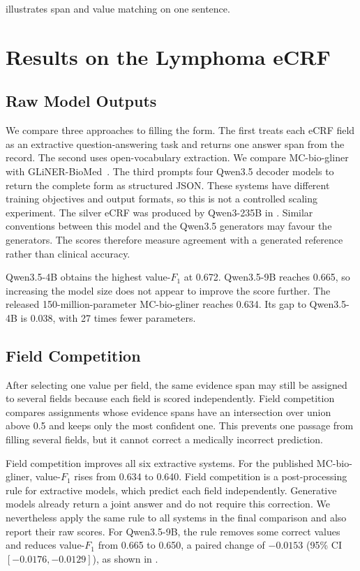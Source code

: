  illustrates span and value matching on one sentence.



\section{Results on the Lymphoma eCRF}

\subsection{Raw Model Outputs}

We compare three approaches to filling the form. The first treats each eCRF
field as an extractive question-answering task and returns one answer span from
the record. The second uses open-vocabulary extraction. We compare MC-bio-gliner
with GLiNER-BioMed~\citep{zaratiana2025glinerbiomed}. The third prompts four
Qwen3.5 decoder models to
return the complete form as structured JSON. These systems have different
training objectives and output formats, so this is not a controlled scaling
experiment. The silver eCRF was produced by Qwen3-235B in
. Similar conventions between this model and the Qwen3.5
generators may favour the generators. The scores therefore measure agreement
with a generated reference rather than clinical accuracy.

Qwen3.5-4B obtains the highest value-$F_1$ at 0.672. Qwen3.5-9B reaches 0.665,
so increasing the model size does not appear to improve the score further. The
released 150-million-parameter MC-bio-gliner reaches 0.634. Its gap to
Qwen3.5-4B is 0.038, with 27 times fewer parameters.

\subsection{Field Competition}

After selecting one value per field, the same evidence span may still be
assigned to several fields because each field is scored independently. Field
competition compares assignments whose evidence spans have an intersection
over union above 0.5 and keeps only the most confident one. This prevents one
passage from filling several fields, but it cannot correct a medically
incorrect prediction.

Field competition improves all six extractive systems. For the published
MC-bio-gliner, value-$F_1$ rises from 0.634 to 0.640. Field competition is a
post-processing rule for extractive models, which predict each field
independently. Generative models already return a joint answer and do not
require this correction. We nevertheless apply the same rule to all systems in
the final comparison and also report their raw scores. For Qwen3.5-9B, the rule
removes some correct values and reduces value-$F_1$ from 0.665 to 0.650, a
paired change of $-0.0153$ (95\% CI $[-0.0176, -0.0129]$), as shown in
.

